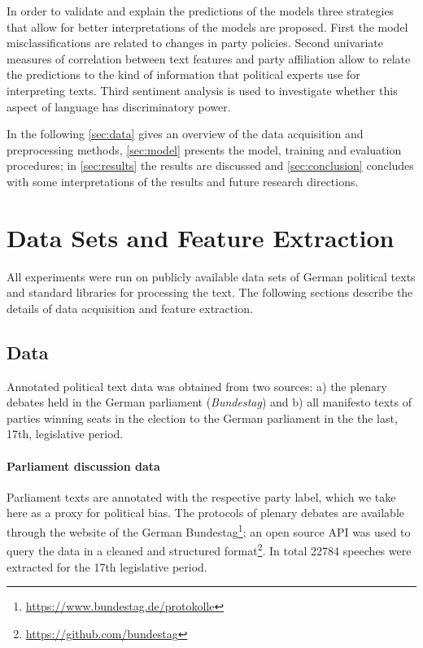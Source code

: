 \documentclass[11pt]{article}
\begin{document}
In order to validate and explain the predictions of the models three strategies that allow for better interpretations of the models are proposed. First the model misclassifications are related to changes in party policies. Second univariate measures of correlation between text features and party affiliation allow to relate the predictions to the kind of information that political experts use for interpreting texts. Third sentiment analysis is used to investigate whether this aspect of language has discriminatory power.

In the following \autoref{sec:data} gives an overview of the data acquisition and preprocessing methods, \autoref{sec:model} presents the model, training and evaluation procedures; in \autoref{sec:results} the results are discussed and \autoref{sec:conclusion} concludes with some interpretations of the results and future research directions.

\section{Data Sets and Feature Extraction}\label{sec:data}
%
All experiments were run on publicly available data sets of German political texts and standard libraries for processing the text. The following sections describe the details of data acquisition and feature extraction.

\subsection{Data}
Annotated political text data was obtained from two sources: a) the plenary debates held in the German parliament ({\em Bundestag}) and b) all manifesto texts of parties winning seats in the election to the German parliament in the the last, 17th, legislative period. 


\paragraph{Parliament discussion data} Parliament texts are annotated with the respective party label, which we take here as a proxy for political bias. The protocols of plenary debates are available through the website of the German Bundestag\footnote{\url{https://www.bundestag.de/protokolle}}; an open source API was used to query the data in a cleaned and structured format\footnote{\url{https://github.com/bundestag}}. In total 22784 speeches were extracted for the 17th legislative period.
\end{document}
